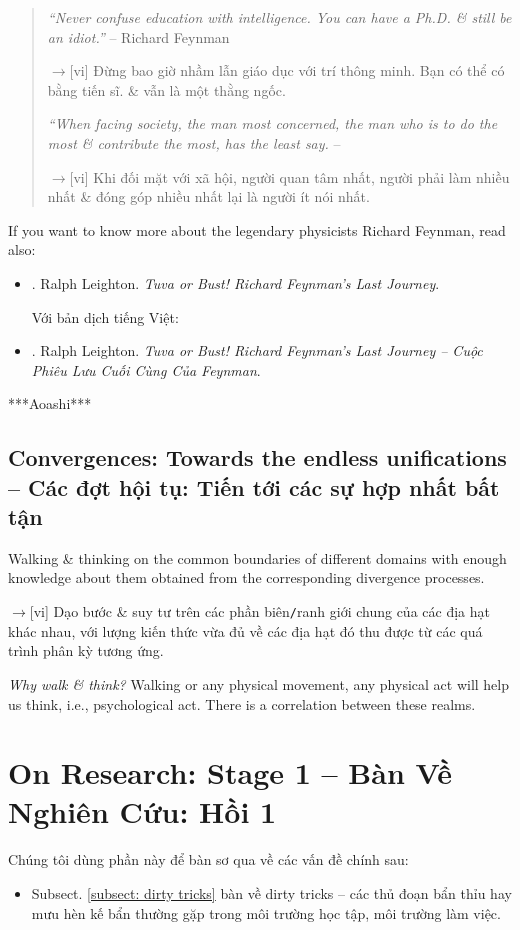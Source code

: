 \documentclass[12pt,twoside]{book}
\begin{document}
\begin{quotation}
	{\it``Never confuse education with intelligence. You can have a Ph.D. \& still be an idiot.''} -- {\sc Richard Feynman}
	
	{\sf[en]$\to$[vi]} Đừng bao giờ nhầm lẫn giáo dục với trí thông minh. Bạn có thể có bằng tiến sĩ. \& vẫn là một thằng ngốc.	
	
	{\it``When facing society, the man most concerned, the man who is to do the most \& contribute the most, has the least say.} -- \cite{Rand_fountainhead}
	
	{\sf[en]$\to$[vi]} Khi đối mặt với xã hội, người quan tâm nhất, người phải làm nhiều nhất \& đóng góp nhiều nhất lại là người ít nói nhất.
\end{quotation}
If you want to know more about the legendary physicists {\sc Richard Feynman}, read also:
\begin{itemize}
	\item \cite{Leighton_Feyman_last_journey}. {\sc Ralph Leighton}. {\it Tuva or Bust! Richard Feynman's Last Journey}.
	
	Với bản dịch tiếng Việt:
	\item \cite{Leighton_Feyman_last_journey_VN}. {\sc Ralph Leighton}. {\it Tuva or Bust! Richard Feynman's Last Journey -- Cuộc Phiêu Lưu Cuối Cùng Của Feynman}.
\end{itemize}


***Aoashi***

\section{Convergences: Towards the endless unifications -- Các đợt hội tụ: Tiến tới các sự hợp nhất bất tận}
Walking \& thinking on the common boundaries of different domains with enough knowledge about them obtained from the corresponding divergence processes.

{\sf[en]$\to$[vi]} Dạo bước \& suy tư trên các phần biên{\tt/}ranh giới chung của các địa hạt khác nhau, với lượng kiến thức vừa đủ về các địa hạt đó thu được từ các quá trình phân kỳ tương ứng.

{\it Why walk \& think?} Walking or any physical movement, any physical act will help us think, i.e., psychological act. There is a correlation between these realms.


\chapter{On Research: Stage 1 -- Bàn Về Nghiên Cứu: Hồi 1}
\label{sect: research stage 1}
\minitoc
Chúng tôi dùng phần này để bàn sơ qua về các vấn đề chính sau:
\begin{itemize}
	\item Subsect. \ref{subsect: dirty tricks} bàn về dirty tricks -- các thủ đoạn bẩn thỉu hay mưu hèn kế bẩn thường gặp trong môi trường học tập, môi trường làm việc.
\end{itemize}
\end{document}
